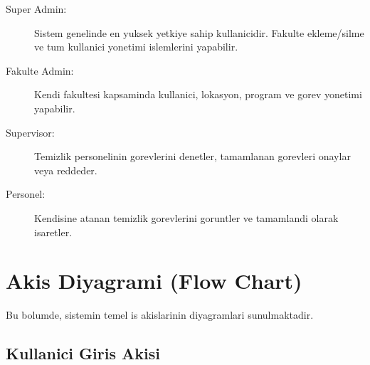 \begin{description}
    \item[Super Admin:] Sistem genelinde en yuksek yetkiye sahip 
    kullanicidir. Fakulte ekleme/silme ve tum kullanici yonetimi 
    islemlerini yapabilir.
    
    \item[Fakulte Admin:] Kendi fakultesi kapsaminda kullanici, 
    lokasyon, program ve gorev yonetimi yapabilir.
    
    \item[Supervisor:] Temizlik personelinin gorevlerini 
    denetler, tamamlanan gorevleri onaylar veya reddeder.
    
    \item[Personel:] Kendisine atanan temizlik gorevlerini 
    goruntler ve tamamlandi olarak isaretler.
\end{description}

\section{Akis Diyagrami (Flow Chart)}
\label{sec:akis-diyagrami}

Bu bolumde, sistemin temel is akislarinin diyagramlari 
sunulmaktadir.

\subsection{Kullanici Giris Akisi}
\label{subsec:giris-akisi}

